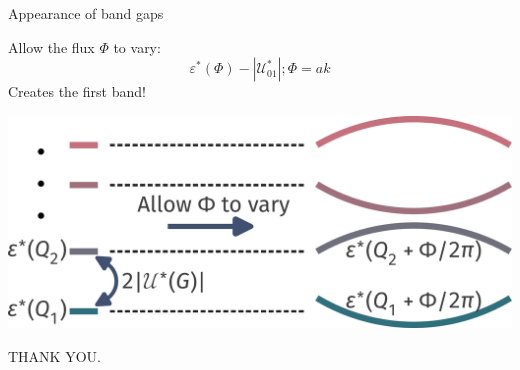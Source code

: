 \documentclass[aspectratio=169,t]{beamer}
\begin{document}
\begin{frame}{Appearance of band gaps}
	\vspace*{\fill}
	\begin{minipage}{0.45\textwidth}
	Allow the flux \(\Phi\) to vary:
	\[\varepsilon^*(\Phi) - |\mathcal{U}^*_{01}|; \Phi = ak\]
	Creates the \alert{first band}!
	\end{minipage}
	\begin{minipage}{0.5\textwidth}
	\includegraphics[width=\textwidth]{URGSpectrum.pdf}
	\end{minipage}
	
\end{frame}

\begin{frame}[c]{}
	\LARGE{THANK YOU.}
\end{frame}
\end{document}
